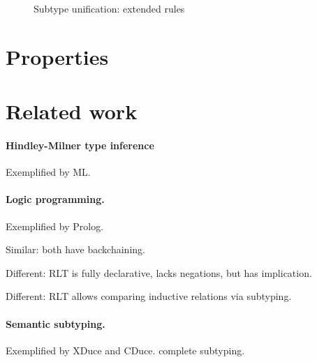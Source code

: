 \documentclass[acmsmall]{acmart}
\begin{document}
\begin{figure*}[h]
\caption{Subtype unification: extended rules}
\end{figure*}




\section{Properties}

\section{Related work}

\paragraph{Hindley-Milner type inference}
Exemplified by ML.

\paragraph{Logic programming.}
Exemplified by Prolog. 

Similar: both have backchaining. 

Different: RLT is fully declarative, lacks negations, but has implication. 

Different: RLT allows comparing inductive relations via subtyping. 

\paragraph{Semantic subtyping.} 
Exemplified by XDuce and CDuce. complete subtyping.
\end{document}
